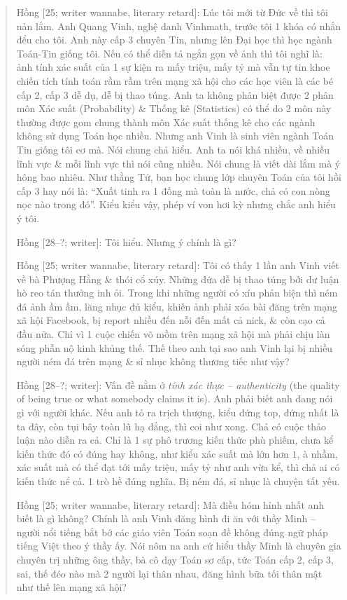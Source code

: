 \documentclass[12pt]{article}
\begin{document}
\begin{quote}
	{\sf Hồng [25; writer wannabe, literary retard]}: Lúc tôi mới từ Đức về thì tôi nản lắm. Anh Quang Vinh, nghệ danh Vinhmath, trước tôi 1 khóa có nhắn đểu cho tôi. Anh này cấp 3 chuyên Tin, nhưng lên Đại học thì học ngành Toán-Tin giống tôi. Nếu có thể diễn tả ngắn gọn về ảnh thì tôi nghĩ là: ảnh tính xác suất của 1 sự kiện ra mấy triệu, mấy tỷ mà vẫn tự tin khoe chiến tích tính toán rầm rầm trên mạng xã hội cho các học viên là các bé cấp 2, cấp 3 dễ dụ, dễ bị thao túng. Anh ta không phân biệt được 2 phân môn Xác suất (Probability) \& Thống kê (Statistics) có thể do 2 môn này thường được gom chung thành môn Xác suất thống kê cho các ngành không sử dụng Toán học nhiều. Nhưng anh Vinh là sinh viên ngành Toán Tin giống tôi cơ mà. Nói chung chả hiểu. Anh ta nói khá nhiều, về nhiều lĩnh vực \& mỗi lĩnh vực thì nói cũng nhiều. Nói chung là viết dài lắm mà ý hông bao nhiêu. Như thằng Tử, bạn học chung lớp chuyên Toán của tôi hồi cấp 3 hay nói là: ``Xuất tinh ra 1 đống mà toàn là nước, chả có con nòng nọc nào trong đó''. Kiểu kiểu vậy, phép ví von hơi kỳ nhưng chắc anh hiểu ý tôi.
	
	{\sf Hồng [28--?; writer]}: Tôi hiểu. Nhưng ý chính là gì?
	
	{\sf Hồng [25; writer wannabe, literary retard]}: Tôi có thấy 1 lần anh Vinh viết về bà Phượng Hằng \& thói cổ xúy. Những đứa dễ bị thao túng bởi dư luận hò reo tán thưởng inh ỏi. Trong khi những người có xíu phản biện thì ném đá ảnh ầm ầm, lăng nhục đủ kiểu, khiến ảnh phải xóa bài đăng trên mạng xã hội Facebook, bị report nhiều đến nỗi đến mất cả nick, \& còn cạo cả đầu nữa. Chỉ vì 1 cuộc chiến võ mồm trên mạng xã hội mà phải chịu làn sóng phẫn nộ kinh khủng thế. Thế theo anh tại sao anh Vinh lại bị nhiều người ném đá trên mạng \& sỉ nhục không thương tiếc như vậy?
	
	{\sf Hồng [28--?; writer]}: Vấn đề nằm ở {\it tính xác thực -- authenticity} ({\sf[n] the quality of being true or what somebody claims it is}). Anh phải biết anh đang nói gì với người khác. Nếu anh tỏ ra trịch thượng, kiểu đứng top, đứng nhất là ta đây, còn tụi bây toàn lũ hạ đẳng, thì coi như xong. Chả có cuộc thảo luận nào diễn ra cả. Chỉ là 1 sự phô trương kiến thức phù phiếm, chưa kể kiến thức đó có đúng hay không, như kiểu xác suất mà lớn hơn $1$, à nhầm, xác suất mà có thể đạt tới mấy triệu, mấy tỷ như anh vừa kể, thì chả ai có kiến thức nể cả. 1 trò hề đúng nghĩa. Bị ném đá, sỉ nhục là chuyện tất yếu.
	
	{\sf Hồng [25; writer wannabe, literary retard]}: Mà điều hóm hỉnh nhất anh biết là gì không? Chính là anh Vinh đăng hình đi ăn với thầy Minh -- người nổi tiếng bắt bớ các giáo viên Toán soạn đề không đúng ngữ pháp tiếng Việt theo ý thầy ấy. Nói nôm na anh cứ hiểu thầy Minh là chuyên gia chuyên trị những ông thầy, bà cô dạy Toán sơ cấp, tức Toán cấp 2, cấp 3, sai, thế đéo nào mà 2 người lại thân nhau, đăng hình bữa tối thân mật như thế lên mạng xã hội?
	

\end{quote}
\end{document}
